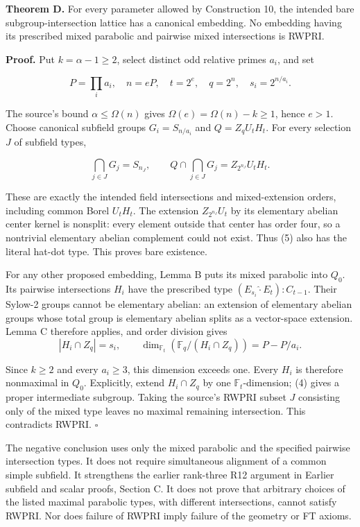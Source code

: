 \documentclass[11pt,a4paper]{article}
\begin{document}
\textbf{Theorem D.} For every parameter allowed by Construction 10, the
intended bare subgroup-intersection lattice has a canonical embedding.
No embedding having its prescribed mixed parabolic and pairwise mixed
intersections is RWPRI.

\textbf{Proof.} Put \(k=\alpha-1\ge2\), select distinct odd relative
primes \(a_i\), and set

\[
 P=\prod_i a_i,\quad n=eP,\quad
 t=2^e,\quad q=2^n,\quad s_i=2^{n/a_i}.
\]

The source's bound \(\alpha\le\Omega(n)\) gives
\(\Omega(e)=\Omega(n)-k\ge1\), hence \(e>1\). Choose canonical subfield
groups \(G_i=S_{n/a_i}\) and \(Q=Z_qU_tH_t\). For every selection \(J\)
of subfield types,

\[
 \bigcap_{j\in J}G_j=S_{n_J},\qquad
 Q\cap\bigcap_{j\in J}G_j=Z_{2^{n_J}}U_tH_t.
\tag{5}
\]

These are exactly the intended field intersections and mixed-extension
orders, including common Borel \(U_tH_t\). The extension
\(Z_{2^{n_J}}U_t\) by its elementary abelian center kernel is nonsplit:
every element outside that center has order four, so a nontrivial
elementary abelian complement could not exist. Thus (5) also has the
literal hat-dot type. This proves bare existence.

For any other proposed embedding, Lemma B puts its mixed parabolic into
\(Q_0\). Its pairwise intersections \(H_i\) have the prescribed type
\((E_{s_i}\widehat{\cdot}E_t):C_{t-1}\). Their Sylow-2 groups cannot be
elementary abelian: an extension of elementary abelian groups whose
total group is elementary abelian splits as a vector-space extension.
Lemma C therefore applies, and order division gives \[
 |H_i\cap Z_q|=s_i,\qquad
 \dim_{\mathbb F_t}(\mathbb F_q/(H_i\cap Z_q))
 =P-P/a_i.
\]

Since \(k\ge2\) and every \(a_i\ge3\), this dimension exceeds one. Every
\(H_i\) is therefore nonmaximal in \(Q_0\). Explicitly, extend
\(H_i\cap Z_q\) by one \(\mathbb F_t\)-dimension; (4) gives a proper
intermediate subgroup. Taking the source's RWPRI subset \(J\) consisting
only of the mixed type leaves no maximal remaining intersection. This
contradicts RWPRI. \(\square\)

The negative conclusion uses only the mixed parabolic and the specified
pairwise intersection types. It does not require simultaneous alignment
of a common simple subfield. It strengthens the earlier rank-three R12
argument in Earlier subfield and scalar proofs, Section C. It does not prove
that arbitrary choices of the listed maximal parabolic types, with
different intersections, cannot satisfy RWPRI. Nor does failure of RWPRI
imply failure of the geometry or FT axioms.
\end{document}
